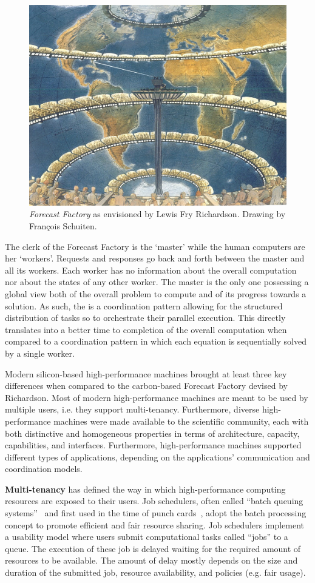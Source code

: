 \documentclass{sig-alternate}
\begin{document}
\begin{figure}[t]
  \centering
    \includegraphics[width=.45\textwidth]{figures/forecast-factory.jpg}
  \caption{\textit{Forecast Factory} as envisioned by Lewis Fry Richardson.
    Drawing by Fran{\c c}ois Schuiten.}
  \label{fig:figures_forecast-factory}
\end{figure}

The clerk of the Forecast Factory is the `master' while the human computers are
her `workers'. Requests and responses go back and forth between the master and
all its workers. Each worker has no information about the overall computation
nor about the states of any other worker. The master is the only one possessing
a global view both of the overall problem to compute and of its progress towards
a solution. As such, the {\bf \MW} is a coordination pattern allowing for the
structured distribution of tasks so to orchestrate their parallel execution.
This directly translates into a better time to completion of the overall
computation when compared to a coordination pattern in which each equation is
sequentially solved by a single worker.

Modern silicon-based high-performance machines brought at least three key
differences when compared to the carbon-based Forecast Factory devised by
Richardson. Most of modern high-performance machines are meant to be used by
multiple users, i.e. they support multi-tenancy. Furthermore, diverse
high-performance machines were made available to the scientific community, each
with both distinctive and homogeneous properties in terms of architecture,
capacity, capabilities, and interfaces. Furthermore, high-performance machines
supported different types of applications, depending on the applications'
communication and coordination models.

{\bf Multi-tenancy} has defined the way in which high-performance computing
resources are exposed to their users. Job schedulers, often called ``batch
queuing systems''~\cite{czajkowski1998} and first used in the time of punch
cards~\cite{katz1966,silberschatz1998}, adopt the batch processing concept to
promote efficient and fair resource sharing. Job schedulers implement a
usability model where users submit computational tasks called ``jobs'' to a
queue. The execution of these job is delayed waiting for the required amount of
resources to be available. The amount of delay mostly depends on the size and
duration of the submitted job, resource availability, and policies (e.g. fair
usage).
\end{document}
